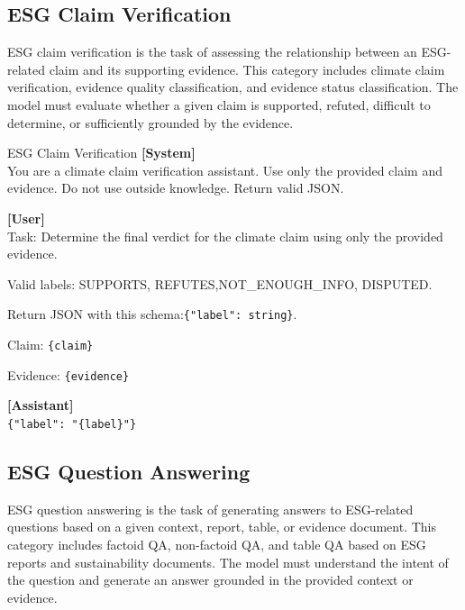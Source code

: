 \documentclass[11pt]{article}
\begin{document}
\subsection{ESG Claim Verification}
ESG claim verification is the task of assessing the relationship between an ESG-related claim and its supporting evidence. This category includes climate claim verification, evidence quality classification, and evidence status classification. The model must evaluate whether a given claim is supported, refuted, difficult to determine, or sufficiently grounded by the evidence.
\begin{promptbox}{ESG Claim Verification}
\small
\textbf{[System]}\\
You are a climate claim verification assistant. Use only the provided claim and evidence. Do not use outside knowledge. Return valid JSON.

\vspace{0.6em}
\textbf{[User]}\\
Task: Determine the final verdict for the climate claim using only the provided evidence.

\vspace{0.3em}
Valid labels: SUPPORTS, REFUTES,\newline NOT\_ENOUGH\_INFO, DISPUTED.

\vspace{0.3em}
Return JSON with this schema:\newline \texttt{\{"label": string\}}.

\vspace{0.3em}
Claim: \texttt{\{claim\}}

\vspace{0.3em}
Evidence: \texttt{\{evidence\}}

\vspace{0.6em}
\textbf{[Assistant]}\\
\texttt{\{"label": "\{label\}"\}}
\end{promptbox}

\subsection{ESG Question Answering}
ESG question answering is the task of generating answers to ESG-related questions based on a given context, report, table, or evidence document. This category includes factoid QA, non-factoid QA, and table QA based on ESG reports and sustainability documents. The model must understand the intent of the question and generate an answer grounded in the provided context or evidence.
\end{document}
